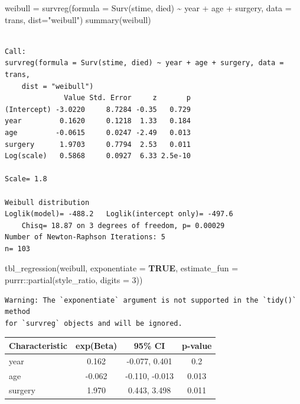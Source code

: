 \documentclass[
  12pt,
  letterpaper,
  DIV=11,
  numbers=noendperiod,
  onepage,
  openany]{scrreprt}
\newenvironment{Shaded}{\begin{snugshade}}{\end{snugshade}}
\newcommand{\AttributeTok}[1]{\textcolor[rgb]{0.80,0.80,0.80}{#1}}
\newcommand{\ConstantTok}[1]{\textcolor[rgb]{0.86,0.64,0.64}{\textbf{#1}}}
\newcommand{\DecValTok}[1]{\textcolor[rgb]{0.86,0.86,0.80}{#1}}
\newcommand{\FunctionTok}[1]{\textcolor[rgb]{0.94,0.94,0.56}{#1}}
\newcommand{\NormalTok}[1]{\textcolor[rgb]{0.80,0.80,0.80}{#1}}
\newcommand{\OtherTok}[1]{\textcolor[rgb]{0.94,0.94,0.56}{#1}}
\newcommand{\SpecialCharTok}[1]{\textcolor[rgb]{0.86,0.64,0.64}{#1}}
\newcommand{\StringTok}[1]{\textcolor[rgb]{0.80,0.58,0.58}{#1}}
\begin{document}
\begin{Shaded}
\begin{Highlighting}[]
\NormalTok{weibull }\OtherTok{=} \FunctionTok{survreg}\NormalTok{(}\AttributeTok{formula =} \FunctionTok{Surv}\NormalTok{(stime, died) }\SpecialCharTok{\textasciitilde{}}\NormalTok{ year }\SpecialCharTok{+}\NormalTok{ age }\SpecialCharTok{+}\NormalTok{ surgery, }\AttributeTok{data =}\NormalTok{ trans, }\AttributeTok{dist=}\StringTok{"weibull"}\NormalTok{)}
\FunctionTok{summary}\NormalTok{(weibull)}
\end{Highlighting}
\end{Shaded}

\begin{verbatim}

Call:
survreg(formula = Surv(stime, died) ~ year + age + surgery, data = trans, 
    dist = "weibull")
              Value Std. Error     z       p
(Intercept) -3.0220     8.7284 -0.35   0.729
year         0.1620     0.1218  1.33   0.184
age         -0.0615     0.0247 -2.49   0.013
surgery      1.9703     0.7794  2.53   0.011
Log(scale)   0.5868     0.0927  6.33 2.5e-10

Scale= 1.8 

Weibull distribution
Loglik(model)= -488.2   Loglik(intercept only)= -497.6
    Chisq= 18.87 on 3 degrees of freedom, p= 0.00029 
Number of Newton-Raphson Iterations: 5 
n= 103 
\end{verbatim}

\begin{Shaded}
\begin{Highlighting}[]
\FunctionTok{tbl\_regression}\NormalTok{(weibull, }\AttributeTok{exponentiate =} \ConstantTok{TRUE}\NormalTok{, }\AttributeTok{estimate\_fun =}\NormalTok{ purrr}\SpecialCharTok{::}\FunctionTok{partial}\NormalTok{(style\_ratio, }\AttributeTok{digits =} \DecValTok{3}\NormalTok{))}
\end{Highlighting}
\end{Shaded}

\begin{verbatim}
Warning: The `exponentiate` argument is not supported in the `tidy()` method
for `survreg` objects and will be ignored.
\end{verbatim}

\begin{longtable}[]{@{}lccc@{}}
\toprule\noalign{}
\textbf{Characteristic} & \textbf{exp(Beta)} & \textbf{95\% CI} &
\textbf{p-value} \\
\midrule\noalign{}
\endhead
\bottomrule\noalign{}
\endlastfoot
year & 0.162 & -0.077, 0.401 & 0.2 \\
age & -0.062 & -0.110, -0.013 & 0.013 \\
surgery & 1.970 & 0.443, 3.498 & 0.011 \\
\end{longtable}
\end{document}
